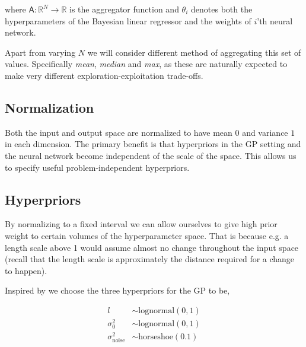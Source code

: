 \documentclass[conference,compsoc]{IEEEtran}
\theoremstyle{definition}
\begin{document}
        \noindent where $\mathsf{A} :\mathbb{R}^{N}\to\mathbb R$ is the aggregator function
        and $\theta_i$ denotes both the hyperparameters of the Bayesian linear regressor and the weights of $i$'th neural network. 
        
        Apart from varying $N$ we will consider different method of aggregating this set of values.
        Specifically \emph{mean}, \emph{median} and \emph{max}, as these are naturally expected to make very different exploration-exploitation trade-offs.

    \subsection{Normalization}
        
        Both the input and output space are normalized to have mean $0$ and variance $1$ in each dimension.
        The primary benefit is that hyperpriors in the GP setting and the neural network become independent of the scale of the space.
        This allows us to specify useful problem-independent hyperpriors.

    \subsection{Hyperpriors}\label{sec:priors}

        By normalizing to a fixed interval we can allow ourselves to give high prior weight to certain volumes of the hyperparameter space.
        That is because e.g. a length scale above 1 would assume almost no change throughout the input space (recall that the length scale is approximately the distance required for a change to happen).
        
        Inspired by \parencite{swersky_freeze-thaw_2014} we choose the three hyperpriors for the GP to be,

        \begin{equation}
            \begin{split}
                l                         & \sim \mathrm{lognormal}(0, 1) \\
                \sigma_0^2                & \sim \mathrm{lognormal}(0, 1) \\
                \sigma_{\mathrm{noise}}^2 & \sim \mathrm{horseshoe}(0.1)
            \end{split}
        \end{equation} %
\end{document}
